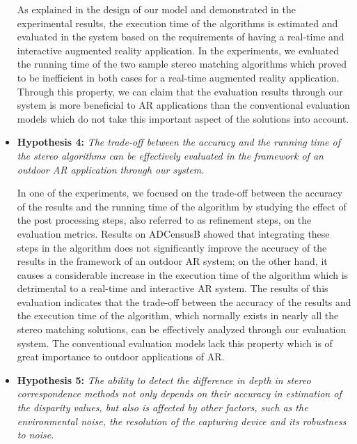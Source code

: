 \begin{itemize}
As explained in the design of our model and demonstrated in the experimental results, the execution time of the algorithms 
is estimated and evaluated in the system based on the requirements of having a real-time and interactive augmented reality application.
In the experiments, we evaluated the running time of the two sample stereo matching algorithms which proved to be inefficient in both cases for 
a real-time augmented reality application. Through this property, we can claim that the evaluation results through our system is more beneficial to AR applications
than the conventional evaluation models which do not take this important aspect of the solutions into account.

\item \textbf{Hypothesis 4:} \emph{The trade-off between the accuracy and the running time of the stereo algorithms can be effectively evaluated 
in the framework of an outdoor AR application through our system.} 

In one of the experiments, we focused on the trade-off between the accuracy of the results and the running time of the algorithm by studying the effect
of the post processing steps, also referred to as refinement steps, on the evaluation metrics. Results on ADCensusB showed that integrating these steps in the algorithm
does not significantly improve the accuracy of the results in the framework of an outdoor AR system; on the other hand, it causes a considerable increase in the execution
time of the algorithm which is detrimental to a real-time and interactive AR system. The results of this evaluation indicates that the trade-off between the accuracy 
of the results and the execution time of the algorithm, which normally exists in nearly all the stereo matching solutions, can be effectively analyzed 
through our evaluation system. The conventional evaluation models lack this property which is of great importance to outdoor applications of AR.

\item \textbf{Hypothesis 5:} \emph{The ability to detect the difference in depth in stereo correspondence methods not only depends on their accuracy
in estimation of the disparity values, but also is affected by other factors, such as the environmental noise, the resolution of the capturing device and its
robustness to noise.}


\end{itemize}
